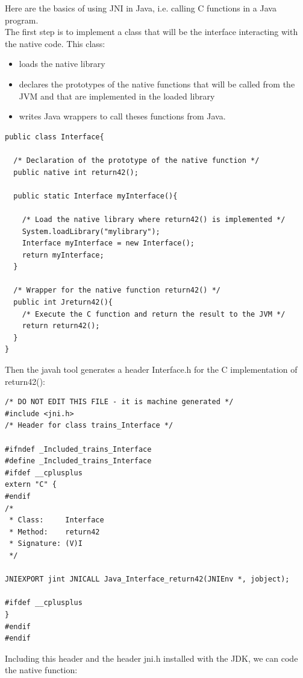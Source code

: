 \documentclass[a4paper,10pt]{report}
\begin{document}
Here are the basics of using JNI in Java, i.e. calling C functions in a Java program.\\

The first step is to implement a class that will be the interface interacting with the native code. This class:
\begin{itemize}
  \item loads the native library
  \item declares the prototypes of the native functions that will be called from the JVM and that are implemented in the loaded library
   \item writes Java wrappers to call theses functions from Java.\\
\end{itemize}

\lstset{language=java}
\lstset{commentstyle=\textit} 
\begin{lstlisting}
public class Interface{

  /* Declaration of the prototype of the native function */
  public native int return42();

  public static Interface myInterface(){

    /* Load the native library where return42() is implemented */
    System.loadLibrary("mylibrary");
    Interface myInterface = new Interface();
    return myInterface;
  }

  /* Wrapper for the native function return42() */
  public int Jreturn42(){
    /* Execute the C function and return the result to the JVM */
    return return42();
  }
}
\end{lstlisting}

Then the javah tool generates a header Interface.h for the C implementation of return42():\\
\lstset{language=C}
\lstset{commentstyle=\textit} 
\begin{lstlisting}
/* DO NOT EDIT THIS FILE - it is machine generated */
#include <jni.h>
/* Header for class trains_Interface */

#ifndef _Included_trains_Interface
#define _Included_trains_Interface
#ifdef __cplusplus
extern "C" {
#endif
/*
 * Class:     Interface
 * Method:    return42
 * Signature: (V)I
 */

JNIEXPORT jint JNICALL Java_Interface_return42(JNIEnv *, jobject);

#ifdef __cplusplus
}
#endif
#endif
\end{lstlisting}

Including this header and the header jni.h installed with the JDK, we can code the native function:\\
\end{document}
